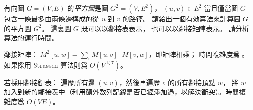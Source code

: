 \startEXERCISE
有向圖 $G=(V,E)$ 的\emph{平方圖}是圖 $G^2=(V,E^2)$，
$(u,v)\in E^2$ 當且僅當圖 $G$ 包含一條最多由兩條邊構成的從 $u$ 到 $v$ 的路徑。
請給出一個有效算法來計算圖 $G$ 的平方圖 $G^2$。
這裏圖 $G$ 既可以以鄰接表表示，
也可以以鄰接矩陣表示。
請分析算法的運行時間。
\stopEXERCISE

\startANSWER
鄰接矩陣： $M^2[u,w] = \sum_{v}M[u,v]\cdot M[v,w]$，即矩陣相乘；
時間複雜度爲 。
如果採用 Strassen 算法則爲 $O(V^{\lg 7})$。

若採用鄰接鏈表：
遍歷所有邊 $(u,v)$，然後再遍歷 $v$ 的所有鄰接頂點 $w$，
將 $w$ 加入到新的鄰接表中（利用額外數列記錄是否已經添加過，以解決衝突）。時間複雜度爲 $O(VE)$。
\stopANSWER
